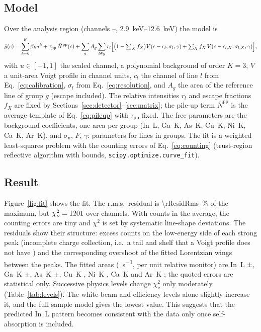 \documentclass[11pt,a4paper]{article}
\newcommand{\code}[1]{\texttt{#1}}
\begin{document}
\subsection{Model}
Over the analysis region (channels \rRoiLo--\rRoiHi, \qtyrange{2.9}{12.6}{keV}) the model is
\begin{equation}
\hat y(c) = \sum_{k=0}^{K} \beta_k u^k + \tau_\mathrm{pp}\,\bar N^\mathrm{pp}(c) +
\sum_g A_g\sum_{l\in g} r_l\Bigl[\bigl(1-\textstyle\sum_X f_X\bigr)V(c-c_l;\sigma_l,\gamma)
+\textstyle\sum_X f_X\,V(c-c_{l,X};\sigma_{l,X},\gamma)\Bigr],
\label{eq:model}
\end{equation}
with $u\in[-1,1]$ the scaled channel, a polynomial background of order $K=3$, $V$ a unit-area Voigt
profile in channel units, $c_l$ the channel of line $l$ from Eq.~\eqref{eq:calibration}, $\sigma_l$
from Eq.~\eqref{eq:resolution}, and $A_g$ the area of the reference line of group $g$ (escape
included). The relative intensities $r_l$ and escape fractions $f_X$ are fixed by
Sections~\ref{sec:detector}--\ref{sec:matrix}; the pile-up term $\bar N^\mathrm{pp}$ is the
average template of Eq.~\eqref{eq:pileup} with $\tau_\mathrm{pp}$ fixed. The free parameters are the
background coefficients, one area per group (In~L, Ga~K, As~K, Cu~K, Ni~K, Ca~K, Ar~K), and
$\sigma_\mathrm{n}$, $F$, $\gamma$: \rNFree{} parameters for \rNLines{} lines in \rNGroups{} groups.
The fit is a weighted least-squares problem with the counting errors of Eq.~\eqref{eq:counting}
(trust-region reflective algorithm with bounds, \code{scipy.optimize.curve\_fit}).

\subsection{Result}
Figure~\ref{fig:fit} shows the fit. The r.m.s.\ residual is \qty{\rResidRms}{\percent} of the
maximum, but $\chi^2_\nu = 1201$ over \rNChan{} channels. With \rTotalCounts{} counts in the
average, the counting errors are tiny and $\chi^2$ is set by systematic line-shape deviations. The
residuals show their structure: excess counts on the low-energy side of each strong peak (incomplete
charge collection, i.e.\ a tail and shelf that a Voigt profile does not have \citep{Phillips1976}) and
the corresponding overshoot of the fitted Lorentzian wings between the peaks. The fitted areas
(\unit{\counts\per\second}, per unit relative monitor) are
In~L \rAreaIn{}$\pm$\rAreaErrIn, Ga~K \rAreaGa{}$\pm$\rAreaErrGa, As~K \rAreaAs{}$\pm$\rAreaErrAs,
Cu~K \rAreaCu, Ni~K \rAreaNi, Ca~K \rAreaCa{} and Ar~K \rAreaAr; the quoted errors are
statistical only. Successive physics levels change $\chi^2_\nu$ only moderately
(Table~\ref{tab:levels}). The white-beam and efficiency levels alone slightly increase it, and the full sample model gives the
lowest value. This suggests that the predicted In~L pattern becomes consistent with the data only
once self-absorption is included.
\end{document}
